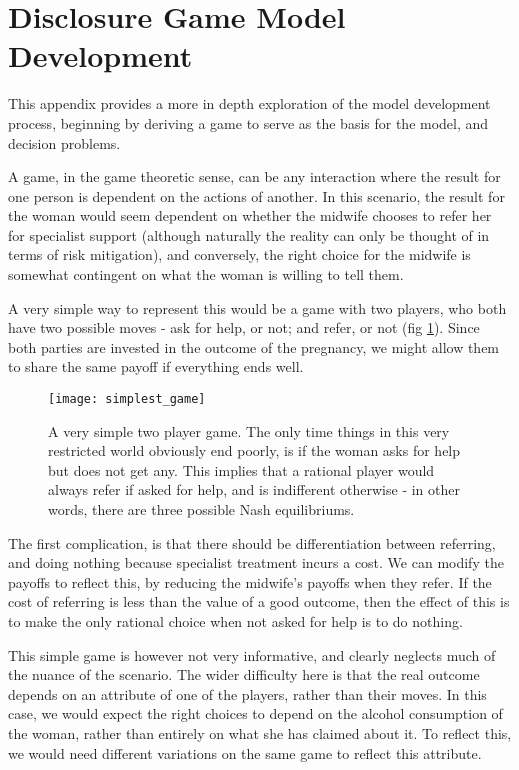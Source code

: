 \section{Disclosure Game Model Development}
\label{app:model_description}

This appendix provides a more in depth exploration of the model development process, beginning by deriving a game to serve as the basis for the model, and decision problems.

A game, in the game theoretic sense, can be any interaction where the result for one person is dependent on the actions of another. In this scenario, the result for the woman would seem dependent on whether the midwife chooses to refer her for specialist support (although naturally the reality can only be thought of in terms of risk mitigation), and conversely, the right choice for the midwife is somewhat contingent on what the woman is willing to tell them.

A very simple way to represent this would be a game with two players, who both have two possible moves - ask for help, or not; and refer, or not (fig \ref{fig:simplest_game}). Since both parties are invested in the outcome of the pregnancy, we might allow them to share the same payoff if everything ends well.


\begin{figure}[H]
\sidecaption
\texttt{[image: simplest\_game]}
\caption{A very simple two player game. The only time things in this very restricted world obviously end poorly, is if the woman asks for help but does not get any. This implies that a rational player would always refer if asked for help, and is indifferent otherwise - in other words, there are three possible Nash equilibriums\protect\footnotemark.}
\label{fig:simplest_game}
\end{figure}


The first complication, is that there should be differentiation between referring, and doing nothing because specialist treatment incurs a cost. We can modify the payoffs to reflect this, by reducing the midwife's payoffs when they refer. If the cost of referring is less than the value of a good outcome, then the effect of this is to make the only rational choice when not asked for help is to do nothing.

This simple game is however not very informative, and clearly neglects much of the nuance of the scenario. The wider difficulty here is that the real outcome depends on an attribute of one of the players, rather than their moves. In this case, we would expect the right choices to depend on the alcohol consumption of the woman, rather than entirely on what she has claimed about it.
To reflect this, we would need different variations on the same game to reflect this attribute. 


